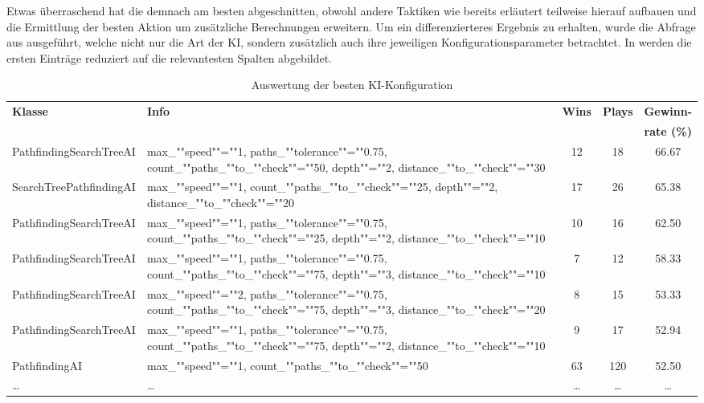 Etwas überraschend hat die  demnach am besten abgeschnitten, obwohl andere Taktiken wie bereits
erläutert teilweise hierauf aufbauen und die Ermittlung der besten Aktion um zusätzliche Berechnungen erweitern.
Um ein differenzierteres Ergebnis zu erhalten, wurde die Abfrage aus  ausgeführt, welche
nicht nur die Art der \ac{KI}, sondern zusätzlich auch ihre jeweiligen Konfigurationsparameter betrachtet.
In  werden die ersten Einträge reduziert auf die relevantesten Spalten
abgebildet.

\begin{table}[htb]
    \centering
    \begin{tabularx}{\textwidth}{|X|X|c|c|c|}
        \hline
		\textbf{Klasse} & \textbf{Info} & \textbf{Wins} & \textbf{Plays} & \textbf{Gewinn-} \\
                        &               &               &                & \textbf{rate (\%)} \\ \hline
        Path\-finding\-Search\-Tree\-AI & max\_""speed""=""1, paths\_""tolerance""=""0.75, count\_""paths\_""to\_""check""=""50, depth""=""2, distance\_""to\_""check""=""30 & 12 & 18 & 66.67 \\ \hline
        Search\-Tree\-Path\-finding\-AI & max\_""speed""=""1, count\_""paths\_""to\_""check""=""25, depth""=""2, distance\_""to\_""check""=""20 & 17 & 26 & 65.38 \\ \hline
        Path\-finding\-Search\-Tree\-AI & max\_""speed""=""1, paths\_""tolerance""=""0.75, count\_""paths\_""to\_""check""=""25, depth""=""2, distance\_""to\_""check""=""10 & 10 & 16 & 62.50 \\ \hline
        Path\-finding\-Search\-Tree\-AI & max\_""speed""=""1, paths\_""tolerance""=""0.75, count\_""paths\_""to\_""check""=""75, depth""=""3, distance\_""to\_""check""=""10 & 7 & 12 & 58.33 \\ \hline
        Path\-finding\-Search\-Tree\-AI & max\_""speed""=""2, paths\_""tolerance""=""0.75, count\_""paths\_""to\_""check""=""75, depth""=""3, distance\_""to\_""check""=""20 & 8 & 15 & 53.33 \\ \hline
        Path\-finding\-Search\-Tree\-AI & max\_""speed""=""1, paths\_""tolerance""=""0.75, count\_""paths\_""to\_""check""=""75, depth""=""2, distance\_""to\_""check""=""10 & 9 & 17 & 52.94 \\ \hline
        Path\-finding\-AI & max\_""speed""=""1, count\_""paths\_""to\_""check""=""50 & 63 & 120 & 52.50 \\ \hline
        \ldots & \ldots & \ldots & \ldots & \ldots \\ \hline
    \end{tabularx}
    \caption{Auswertung der besten \ac{KI}-Konfiguration}
    \label{tab:evaluation-ki-konfiguration}
\end{table}

